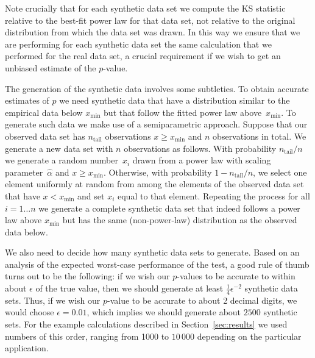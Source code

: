 \documentclass[final]{siamltex}
\newcommand{\xmin}{\ensuremath{x_{\min}}}
\begin{document}
Note crucially that for each synthetic data set we compute the KS statistic
relative to the best-fit power law for that data set, not relative to the
original distribution from which the data set was drawn.  In this way we
ensure that we are performing for each synthetic data set the same
calculation that we performed for the real data set, a crucial requirement
if we wish to get an unbiased estimate of the $p$-value.

The generation of the synthetic data involves some subtleties.  To obtain
accurate estimates of $p$ we need synthetic data that have a distribution
similar to the empirical data below $\xmin$ but that follow the fitted
power law above~$\xmin$.  To generate such data we make use of a
semiparametric approach.  Suppose that our observed data set has
$n_\mathrm{tail}$ observations $x\ge\xmin$ and $n$ observations in total.
We generate a new data set with $n$ observations as follows.  With
probability $n_\mathrm{tail}/n$ we generate a random number~$x_i$ drawn
from a power law with scaling parameter~$\hat{\alpha}$ and $x\ge\xmin$.
Otherwise, with probability $1-n_\mathrm{tail}/n$, we select one element
uniformly at random from among the elements of the observed data set that
have $x<\xmin$ and set $x_i$ equal to that element.  Repeating the process
for all $i=1\ldots n$ we generate a complete synthetic data set that indeed
follows a power law above $\xmin$ but has the same (non-power-law)
distribution as the observed data below.

We also need to decide how many synthetic data sets to generate.  Based on
an analysis of the expected worst-case performance of the test, a good rule
of thumb turns out to be the following: if we wish our $p$-values to be
accurate to within about $\epsilon$ of the true value, then we should
generate at least $\frac14 \epsilon^{-2}$ synthetic data sets.  Thus, if we
wish our $p$-value to be accurate to about 2 decimal digits, we would
choose $\epsilon=0.01$, which implies we should generate about $2500$
synthetic sets.  For the example calculations described in
Section~\ref{sec:results} we used numbers of this order, ranging from 1000
to $10\,000$ depending on the particular application.
\end{document}
